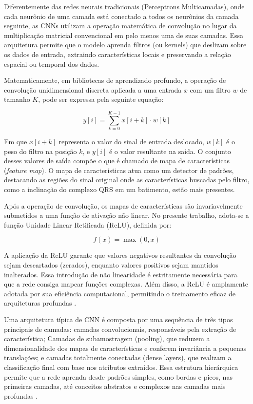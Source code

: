 Diferentemente das redes neurais tradicionais (Perceptrons Multicamadas), onde cada neurônio de uma camada está conectado a todos os neurônios da 
camada seguinte, as CNNs utilizam a operação matemática de convolução no lugar da multiplicação matricial convencional em pelo menos uma de suas 
camadas. Essa arquitetura permite que o modelo aprenda filtros (ou kernels) que deslizam sobre os dados de entrada, extraindo características locais 
e preservando a relação espacial ou temporal dos dados.

Matematicamente, em bibliotecas de aprendizado profundo, a operação de convolução unidimensional discreta aplicada a uma entrada $x$ com um 
filtro $w$ de tamanho $K$, pode ser expressa pela seguinte equação:

\begin{equation}
    \label{eq: eq1}
	y[i] = \sum_{k=0}^{K-1} x[i+k] \cdot w[k]
\end{equation}

Em que $x[i+k]$ representa o valor do sinal de entrada deslocado, $w[k]$ é o peso do filtro na posição $k$, e $y[i]$ é o valor resultante na saída. 
O conjunto desses valores de saída compõe o que é chamado de mapa de características (\textit{feature map}). O mapa de características atua como um 
detector de padrões, destacando as regiões do sinal original onde as características buscadas pelo filtro, como a inclinação do complexo QRS em 
um batimento, estão mais presentes.

Após a operação de convolução, os mapas de características são invariavelmente submetidos a uma função de ativação não linear. No presente trabalho, 
adota-se a função Unidade Linear Retificada (ReLU), definida por:

\begin{equation}
    \label{eq: eq2}
    f(x) = \max(0, x)
\end{equation}

A aplicação da ReLU garante que valores negativos resultantes da convolução sejam descartados (zerados), enquanto valores positivos sejam mantidos 
inalterados. Essa introdução de não linearidade é estritamente necessária para que a rede consiga mapear funções complexas. Além disso, a ReLU é 
amplamente adotada por sua eficiência computacional, permitindo o treinamento eficaz de arquiteturas profundas .

Uma arquitetura típica de CNN é composta por uma sequência de três tipos principais de camadas: camadas convolucionais, responsáveis pela extração de 
característica; Camadas de subamostragem (pooling), que reduzem a dimensionalidade dos mapas de características e conferem invariância a pequenas 
translações; e camadas totalmente conectadas (dense layers), que realizam a classificação final com base nos atributos extraídos. Essa estrutura 
hierárquica permite que a rede aprenda desde padrões simples, como bordas e picos, nas primeiras camadas, até conceitos abstratos e complexos nas 
camadas mais profundas .


